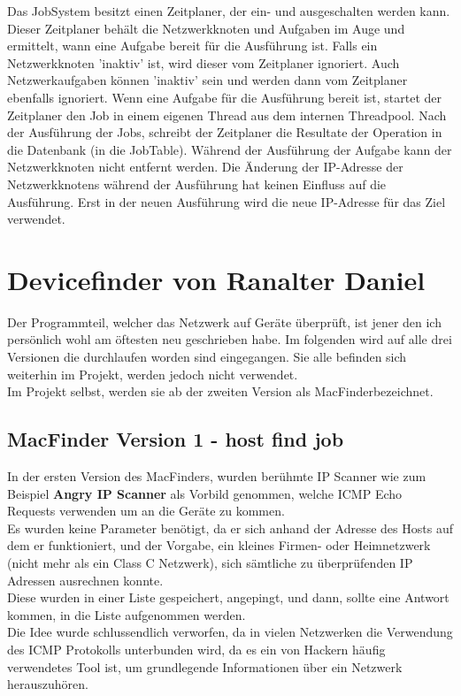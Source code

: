 \documentclass[12pt,a4paper]{report}
\begin{document}
Das JobSystem besitzt einen Zeitplaner, der ein- und ausgeschalten werden kann. Dieser Zeitplaner behält die Netzwerkknoten und Aufgaben im Auge und ermittelt, wann eine Aufgabe bereit für die Ausführung ist. Falls ein Netzwerkknoten 'inaktiv' ist, wird dieser vom Zeitplaner ignoriert. Auch Netzwerkaufgaben können 'inaktiv' sein und werden dann vom Zeitplaner ebenfalls ignoriert. Wenn eine Aufgabe für die Ausführung bereit ist, startet der Zeitplaner den Job in einem eigenen Thread aus dem internen Threadpool. Nach der Ausführung der Jobs, schreibt der Zeitplaner die Resultate der Operation in die Datenbank (in die JobTable). Während der Ausführung der Aufgabe kann der Netzwerkknoten nicht entfernt werden. Die Änderung der IP-Adresse der Netzwerkknotens während der Ausführung hat keinen Einfluss auf die Ausführung. Erst in der neuen Ausführung wird die neue IP-Adresse für das Ziel verwendet.

\chapter{Devicefinder von Ranalter Daniel}
Der Programmteil, welcher das Netzwerk auf Geräte überprüft, ist jener den ich persönlich wohl am öftesten neu geschrieben habe. Im folgenden wird auf alle drei Versionen die durchlaufen worden sind eingegangen. Sie alle befinden sich weiterhin im Projekt, werden jedoch nicht verwendet.\\
Im Projekt selbst, werden sie ab der zweiten Version als \glqq MacFinder\grqq bezeichnet. 
\section{MacFinder Version 1 - host find job}
In der ersten Version des MacFinders, wurden berühmte IP Scanner wie zum Beispiel \textbf{Angry IP Scanner} als Vorbild genommen, welche ICMP Echo Requests verwenden um an die Geräte zu kommen.\\
Es wurden keine Parameter benötigt, da er sich anhand der Adresse des Hosts auf dem er funktioniert, und der Vorgabe, ein kleines Firmen- oder Heimnetzwerk (nicht mehr als ein Class C Netzwerk), sich sämtliche zu überprüfenden IP Adressen ausrechnen konnte.\\
Diese wurden in einer Liste gespeichert, \glqq angepingt\grqq , und dann, sollte eine Antwort kommen, in die Liste aufgenommen werden.\\

Die Idee wurde schlussendlich verworfen, da in vielen Netzwerken die Verwendung des ICMP Protokolls unterbunden wird, da es ein von Hackern häufig verwendetes Tool ist, um grundlegende Informationen über ein Netzwerk herauszuhören.
\end{document}
